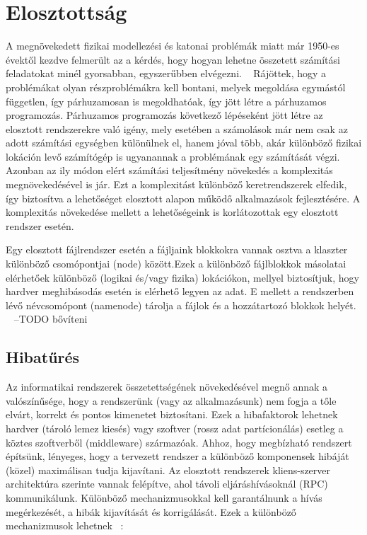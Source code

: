 \documentclass[a4paper,12pt]{article}
\begin{document}
\section{Elosztottság}
A megnövekedett fizikai modellezési és katonai problémák miatt már 1950-es évektől kezdve felmerült az a kérdés, hogy hogyan lehetne összetett számítási feladatokat minél gyorsabban, egyszerűbben elvégezni. ~\cite{cocke} Rájöttek, hogy a problémákat olyan részproblémákra kell bontani, melyek megoldása egymástól független, így párhuzamosan is megoldhatóak, így jött létre a párhuzamos programozás. \linebreak
Párhuzamos programozás következő lépéseként jött létre az elosztott rendszerekre való igény, mely esetében a számolások már nem csak az adott számítási egységben különülnek el, hanem jóval több, akár különböző fizikai lokáción levő számítógép is ugyanannak a problémának egy számítását végzi. Azonban az ily módon elért számítási teljesítmény növekedés a komplexitás megnövekedésével is jár. Ezt a komplexitást különböző keretrendszerek elfedik, így biztosítva a lehetőséget elosztott alapon működő alkalmazások fejlesztésére. A komplexitás növekedése mellett a lehetőségeink is korlátozottak egy elosztott rendszer esetén. \linebreak \linebreak

Egy elosztott fájlrendszer esetén a fájljaink blokkokra vannak osztva a klaszter különböző csomópontjai (node) között.Ezek a különböző fájlblokkok másolatai elérhetőek különböző (logikai és/vagy fizika) lokációkon, mellyel biztosítjuk, hogy hardver meghibásodás esetén is elérhető legyen az adat. E mellett a rendszerben lévő névcsomópont (namenode) tárolja a fájlok és a hozzátartozó blokkok helyét. ~\cite{hdfs}
--TODO bővíteni

\subsection{Hibatűrés}

Az informatikai rendszerek összetettségének növekedésével megnő annak a valószínűsége, hogy a rendszerünk (vagy az alkalmazásunk) nem fogja a tőle elvárt, korrekt és pontos kimenetet biztosítani. Ezek a hibafaktorok lehetnek hardver (tároló lemez kiesés) vagy szoftver (rossz adat partícionálás) esetleg a köztes szoftverből (middleware) származóak. Ahhoz, hogy megbízható rendszert építsünk, lényeges, hogy a tervezett rendszer a különböző komponensek hibáját (közel) maximálisan tudja kijavítani. Az elosztott rendszerek kliens-szerver architektúra szerinte vannak felépítve, ahol távoli eljáráshívásoknál (RPC) kommunikálunk. Különböző mechanizmusokkal kell garantálnunk a hívás megérkezését, a hibák kijavítását és korrigálását. Ezek a különböző mechanizmusok lehetnek ~\cite{szemantika	}:
\end{document}
